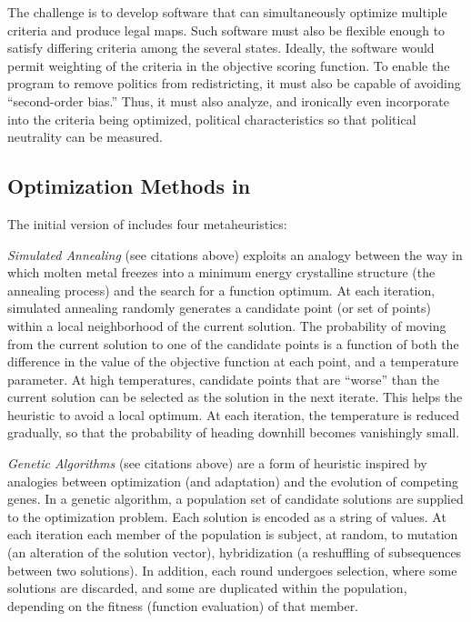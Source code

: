 \documentclass[article]{JSSstyle/jss}
\begin{document}
The challenge is to develop software that can simultaneously optimize multiple 
criteria and produce legal maps.  Such software must also be flexible 
enough to satisfy differing criteria among the several states.  
Ideally, the software would permit weighting of the criteria in the 
objective scoring function.  To enable the program to remove politics from redistricting, it 
must also be capable of avoiding ``second-order bias.''  Thus, it must also analyze, 
and ironically even incorporate into the criteria being optimized, political 
characteristics so that political neutrality can be measured. 

\subsection[Optimization Methods in BARD]{Optimization Methods in }

The initial version of  includes four metaheuristics: 

\emph{Simulated Annealing} (see citations above) exploits an analogy between the
way in which molten metal freezes into a minimum energy
crystalline structure (the annealing process) and the search for a
function optimum.  At each iteration, simulated annealing randomly generates
a candidate point (or set of points) within a local neighborhood
of the current solution. The probability of moving from the
current solution to one of the candidate points is a function of both
the difference in the value of the objective function at each point, and a 
temperature parameter. At high temperatures, candidate points that are ``worse'' than 
the current solution can be selected as the solution in the next iterate.  This helps the 
heuristic to avoid a local optimum. At each iteration, the temperature is reduced gradually, so 
that the probability of heading downhill becomes vanishingly small.

\emph{Genetic Algorithms} (see citations above) are a form of heuristic inspired by analogies 
between optimization (and adaptation) and the evolution of competing
genes.  In a genetic algorithm, a population set of candidate solutions are supplied to the optimization problem. 
Each solution is encoded as a string of values. At each iteration each member of the population is subject, at random, 
to mutation (an alteration of the solution vector), hybridization (a reshuffling of subsequences between two solutions). 
In addition, each round undergoes selection, where some solutions are discarded, and some are 
duplicated within the population, depending on the fitness (function evaluation) of that member.
\end{document}
